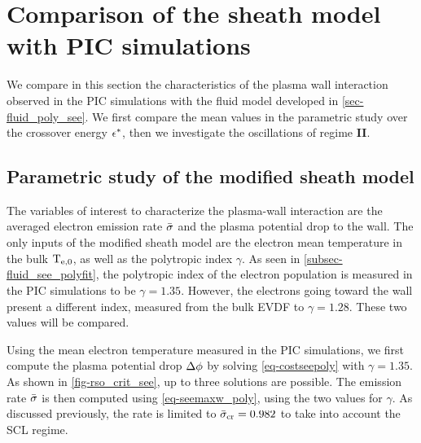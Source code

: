 

\section{Comparison of the sheath model with PIC simulations} \label{subsec-picandmodel}


  We compare in this section the characteristics of the plasma wall interaction observed in the \ac{PIC} simulations with the fluid model developed in \cref{sec-fluid_poly_see}.
  We first compare the mean values in the parametric study over the crossover energy $\epsilon^{*}$, then we investigate the oscillations of regime {\bf II}.

  \subsection{Parametric study of the modified sheath model} \label{subsec-param_sheath_see}

    The variables of interest to characterize the plasma-wall interaction are the averaged electron emission rate $ \bar{\sigma }$ and the plasma potential drop to the wall.
    The only inputs of the modified sheath model are the electron mean temperature in the bulk $\mathrm{T_{e, 0}}$, as well as the polytropic index $\gamma$.
    As seen in \cref{subsec-fluid_see_polyfit}, the polytropic index of the electron population is measured in the \ac{PIC} simulations to be $\gamma=1.35$.
    However, the electrons going toward the wall present a different index, measured from the bulk \ac{EVDF} to $\gamma=1.28$.
    These two values will be compared.

    Using the mean electron temperature measured in the \ac{PIC} simulations, we first compute the plasma potential drop $\Delta \phi$ by solving \cref{eq-costseepoly} with $\gamma=1.35$.
    As shown in \cref{fig-rso_crit_see}, up to three solutions are possible.
    The emission rate $ \bar{\sigma }$ is then computed using \cref{eq-seemaxw_poly}, using the two values for $\gamma$.
    As discussed previously, the rate is limited to $ \bar{\sigma }_{\rm cr}=0.982$ to take into account the \ac{SCL} regime.

